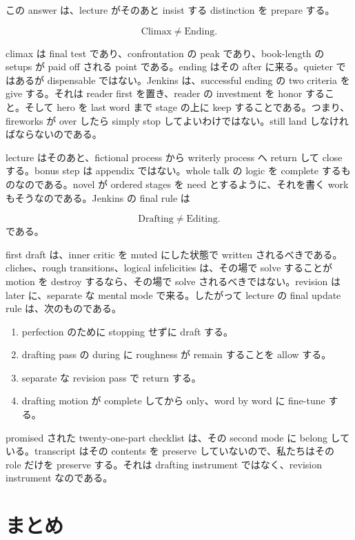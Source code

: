 この answer は、lecture がそのあと insist する distinction を prepare する。

\begin{equation}
\text{Climax} \neq \text{Ending}.
\end{equation}

climax は final test であり、confrontation の peak であり、book-length の setups が paid off される point である。ending はその after に来る。quieter ではあるが dispensable ではない。Jenkins は、successful ending の two criteria を give する。それは reader first を置き、reader の investment を honor すること。そして hero を last word まで stage の上に keep することである。つまり、fireworks が over したら simply stop してよいわけではない。still land しなければならないのである。

lecture はそのあと、fictional process から writerly process へ return して close する。bonus step は appendix ではない。whole talk の logic を complete するものなのである。novel が ordered stages を need とするように、それを書く work もそうなのである。Jenkins の final rule は

\begin{equation}
\text{Drafting} \neq \text{Editing}.
\end{equation}
である。

first draft は、inner critic を muted にした状態で written されるべきである。cliches、rough transitions、logical infelicities は、その場で solve することが motion を destroy するなら、その場で solve されるべきではない。revision は later に、separate な mental mode で来る。したがって lecture の final update rule は、次のものである。

\begin{enumerate}
\item perfection のために stopping せずに draft する。
\item drafting pass の during に roughness が remain することを allow する。
\item separate な revision pass で return する。
\item drafting motion が complete してから only、word by word に fine-tune する。
\end{enumerate}

promised された twenty-one-part checklist は、その second mode に belong している。transcript はその contents を preserve していないので、私たちはその role だけを preserve する。それは drafting instrument ではなく、revision instrument なのである。

\section{まとめ}

